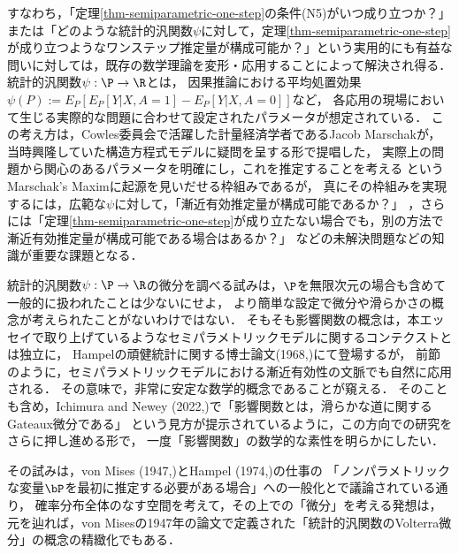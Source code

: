\documentclass[uplatex, dvipdfmx]{jsarticle}
\begin{document}
すなわち，「定理\ref{thm-semiparametric-one-step}の条件(N5)がいつ成り立つか？」または「どのような統計的汎関数$\psi$に対して，定理\ref{thm-semiparametric-one-step}が成り立つようなワンステップ推定量が構成可能か？」という実用的にも有益な問いに対しては，既存の数学理論を変形・応用することによって解決され得る．
統計的汎関数$\psi:\P\to\R$とは，
因果推論における平均処置効果$\psi(P):=E_P[E_P[Y|X,A=1]-E_P[Y|X,A=0]]$など，
各応用の現場において生じる実際的な問題に合わせて設定されたパラメータが想定されている．
この考え方は，Cowles委員会で活躍した計量経済学者であるJacob Marschakが，
当時興隆していた構造方程式モデルに疑問を呈する形で提唱した，
実際上の問題から関心のあるパラメータを明確にし，これを推定することを考える
というMarschak's Maximに起源を見いだせる枠組みであるが\cite{van der Laan}，
真にその枠組みを実現するには，広範な$\psi$に対して，「漸近有効推定量が構成可能であるか？」
，さらには「定理\ref{thm-semiparametric-one-step}が成り立たない場合でも，別の方法で漸近有効推定量が構成可能である場合はあるか？」
などの未解決問題\cite{Kennedy}などの知識が重要な課題となる．

統計的汎関数$\psi:\P\to\R$の微分を調べる試みは，$\P$を無限次元の場合も含めて一般的に扱われたことは少ないにせよ，
より簡単な設定で微分や滑らかさの概念が考えられたことがないわけではない．
そもそも影響関数の概念は，本エッセイで取り上げているようなセミパラメトリックモデルに関するコンテクストとは独立に，
Hampelの頑健統計に関する博士論文(1968,\cite{Hampel68})にて登場するが，
前節のように，セミパラメトリックモデルにおける漸近有効性の文脈でも自然に応用される．
その意味で，非常に安定な数学的概念であることが窺える．
そのことも含め，Ichimura and Newey (2022,\cite{Ichimura and Newey})で「影響関数とは，滑らかな道に関するGateaux微分である」
という見方が提示されているように，この方向での研究をさらに押し進める形で，
一度「影響関数」の数学的な素性を明らかにしたい．

その試みは，von Mises (1947,\cite{von Mises})とHampel (1974,\cite{Hampel74})の仕事の
「ノンパラメトリックな変量$\bP$を最初に推定する必要がある場合」への一般化と\cite{Ichimura and Newey}で議論されている通り，
確率分布全体のなす空間を考えて，その上での「微分」を考える発想は，
元を辿れば，von Misesの1947年の論文\cite{von Mises}で定義された「統計的汎関数のVolterra微分」の概念の精緻化でもある．
\end{document}
